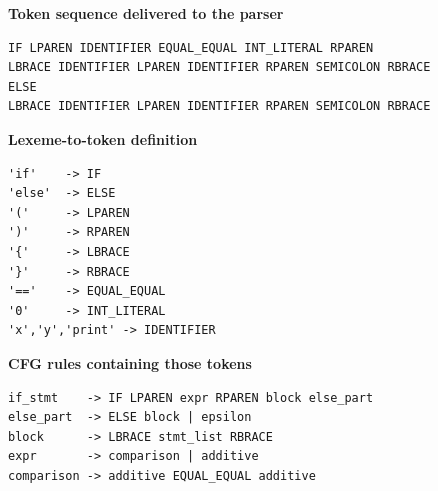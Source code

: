 \documentclass[11pt,a4paper]{article}
\begin{document}
\noindent\textbf{Token sequence delivered to the parser}
\begin{lstlisting}[language={},numbers=none,frame=single,backgroundcolor=\color{codebg}]
IF LPAREN IDENTIFIER EQUAL_EQUAL INT_LITERAL RPAREN
LBRACE IDENTIFIER LPAREN IDENTIFIER RPAREN SEMICOLON RBRACE
ELSE
LBRACE IDENTIFIER LPAREN IDENTIFIER RPAREN SEMICOLON RBRACE
\end{lstlisting}

\noindent\textbf{Lexeme-to-token definition}
\begin{lstlisting}[language={},numbers=none,frame=single,backgroundcolor=\color{codebg}]
'if'    -> IF
'else'  -> ELSE
'('     -> LPAREN
')'     -> RPAREN
'{'     -> LBRACE
'}'     -> RBRACE
'=='    -> EQUAL_EQUAL
'0'     -> INT_LITERAL
'x','y','print' -> IDENTIFIER
\end{lstlisting}

\noindent\textbf{CFG rules containing those tokens}
\begin{lstlisting}[language={},numbers=none,frame=single,backgroundcolor=\color{codebg}]
if_stmt    -> IF LPAREN expr RPAREN block else_part
else_part  -> ELSE block | epsilon
block      -> LBRACE stmt_list RBRACE
expr       -> comparison | additive
comparison -> additive EQUAL_EQUAL additive
\end{lstlisting}
\end{document}
